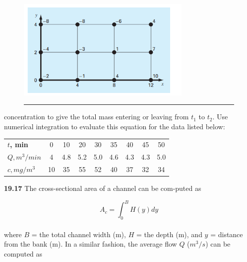 \documentclass[../main.tex]{subfiles}
\begin{document}
\begin{figure}[hbt!]
	\centering
	\includegraphics[width=0.75\textwidth]{pic.007}
	\caption{\textsf{}} \hrule
	\label{pic.007}
\end{figure}

\begin{multicols}{2}
concentration to give the total mass entering or leaving from
$t_1$ to $t_2$. Use numerical integration to evaluate this equation
for the data listed below:\\
\begin{tabular}{lcccccccc}
	\hline
	\scriptsize{\textbf{$t$, min}} & \scriptsize{0} & \scriptsize{10} & \scriptsize{20} & \scriptsize{30} & \scriptsize{35} & \scriptsize{40} & \scriptsize{45} & \scriptsize{50}\\
	\scriptsize{\textbf{$Q, m^3/min$}} & \scriptsize{4} & \scriptsize{4.8} & \scriptsize{5.2} & \scriptsize{5.0} & \scriptsize{4.6} & \scriptsize{4.3} & \scriptsize{4.3} & \scriptsize{5.0}\\
	\scriptsize{\textbf{$c, mg/m^3$}} & \scriptsize{10} & \scriptsize{35} & \scriptsize{55} & \scriptsize{52} & \scriptsize{40} & \scriptsize{37} & \scriptsize{32} & \scriptsize{34}\\ 	\hline

\end{tabular}

\textbf{19.17} The cross-sectional area of a channel can be com-puted as

	$$A_c=\int^{B}_{0}H(y)dy$$\\
where $B$ = the total channel width (m), $H$ = the depth (m),
and $y$ = distance from the bank (m). In a similar fashion, the
average flow $Q$ ($m^3/s$) can be computed as


\end{multicols}
\end{document}
